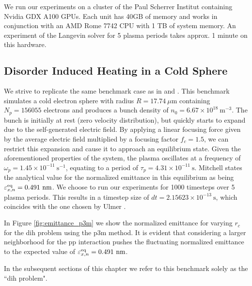 We run our experiments on a cluster of the Paul Scherrer Institut containing Nvidia GDX A100 GPUs.
Each unit has 40GB of memory and works in conjunction with an AMD Rome 7742 CPU
with 1 TB of system memory.
An experiment of the Langevin solver for 5 plasma periods takes approx. 1 minute on this hardware.


\subsection{Disorder Induced Heating in a Cold Sphere}
\label{subsection:dih_coldsphere}

We strive to replicate the same benchmark case as in \cite{mitchell2015parallel} and
\cite{p3m_ulmer}.
This benchmark simulates a cold electron sphere with radius $R = 17.74\ \mu \text{m}$ containing $N_p = 156055$
electrons and produces a bunch density of $n_0 = 6.67 \times 10^{18}\ \text{m}^{-3}$.
The bunch is initially at rest (zero velocity distribution), but quickly starts to expand due to the
self-generated electric field.
By applying a linear focusing force given by the average electric field multiplied by a focusing factor
$f_c = 1.5$, we can restrict this expansion and cause it to approach an equilibrium state.
Given the aforementioned properties of the system, the plasma oscillates at a frequency
of $\omega_p = 1.45 \times 10^{-11}\ \text{s}^{-1}$, equating to a period of 
$\tau_p = 4.31 \times 10^{-11}\ \text{s}$.
Mitchell \cite{mitchell2015parallel} states the analytical value for the normalized emittance
in this equilibrium as being $\varepsilon_{x,n}^{\text{eq}} = 0.491\ \text{nm}$.
We choose to run our experiments for 1000 timesteps over 5 plasma periods.
This results in a timestep size of $dt = 2.15623\times10^{-13}\ \text{s}$, which coincides with the
one chosen by Ulmer \cite{p3m_ulmer}.

In Figure \ref{fig:emittance_p3m} we show the normalized emittance for varying $r_c$ for the
\gls{dih}
problem using the \gls{p3m} method. It is evident that considering a larger neighborhood for the
\gls{pp} interaction pushes the
fluctuating normalized emittance to the expected value of $\varepsilon_{x,n}^{\text{eq}} = 0.491\ \text{nm}$.

In the subsequent sections of this chapter we refer to this benchmark solely as the ``\gls{dih} problem".


